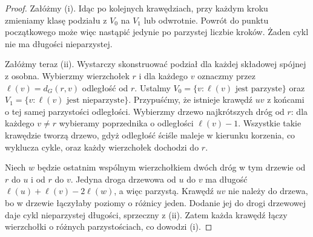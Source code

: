 \documentclass[11pt,a4paper]{report}
\numberwithin{equation}{section}
\theoremstyle{plain}
\theoremstyle{definition}
\theoremstyle{remark}
\begin{document}
\begin{proof}
Załóżmy (i). Idąc po kolejnych krawędziach, przy
każdym kroku zmieniamy klasę podziału z $V_0$ na
$V_1$ lub odwrotnie. Powrót do punktu początkowego
może więc nastąpić jedynie po parzystej liczbie
kroków. Żaden cykl nie ma długości nieparzystej.

Załóżmy teraz (ii). Wystarczy skonstruować podział
dla każdej składowej spójnej z osobna. Wybierzmy
wierzchołek $r$ i dla każdego $v$ oznaczmy przez
$\ell(v)=d_G(r,v)$ odległość od $r$. Ustalmy
$V_0=\{v:\ell(v)\text{ jest parzyste}\}$
oraz $V_1=\{v:\ell(v)\text{ jest nieparzyste}\}$.
Przypuśćmy, że istnieje krawędź $uv$ z końcami
o tej samej parzystości odległości. Wybierzmy
drzewo najkrótszych dróg od $r$: dla każdego
$v\ne r$ wybieramy poprzednika o odległości
$\ell(v)-1$. Wszystkie takie krawędzie tworzą
drzewo, gdyż odległość ściśle maleje w kierunku
korzenia, co wyklucza cykle, oraz każdy wierzchołek
dochodzi do $r$.

Niech $w$ będzie ostatnim wspólnym wierzchołkiem
dwóch dróg w tym drzewie od $r$ do $u$ i od $r$
do $v$. Jedyna droga drzewowa od $u$ do $v$
ma długość $\ell(u)+\ell(v)-2\ell(w)$, a więc
parzystą. Krawędź $uv$ nie należy do drzewa,
bo w drzewie łączyłaby poziomy o różnicy jeden.
Dodanie jej do drogi drzewowej daje cykl
nieparzystej długości, sprzeczny z (ii).
Zatem każda krawędź łączy wierzchołki o
różnych parzystościach, co dowodzi (i).
\end{proof}

\begin{center}
\end{center}
\end{document}
